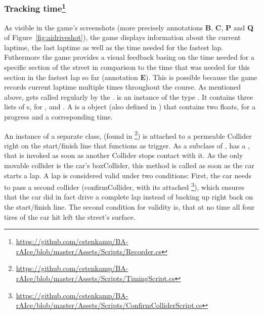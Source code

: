 \subsubsection{Tracking time\footnote{\url{https://github.com/cstenkamp/BA-rAIce/blob/master/Assets/Scripts/Recorder.cs}}}

As visible in the game's screenshots (more precisely annotations \textbf{B}, \textbf{C}, \textbf{P} and \textbf{Q} of Figure~\ref{fig:aidriveshot}), the game displays information about the current laptime, the last laptime as well as the time needed for the fastest lap. Futhermore the game provides a visual feedback basing on the time needed for a specific section of the street in comparison to the time that was needed for this section in the fastest lap so far (annotation \textbf{E}). This is possible because the game records current laptime multiple times throughout the course. As mentioned above,  gets called regularly by the .  is an instance of the type . It contains three lists of s, for ,  and . A  is a  object (also defined in ) that contains two floats, for a progress and a corresponding time.

An instance of a separate class,  (found in \footnote{\url{https://github.com/cstenkamp/BA-rAIce/blob/master/Assets/Scripts/TimingScript.cs}}) is attached to a permeable Collider right on the start/finish line that functions as trigger. As a subclass of ,  has a , that is invoked as soon as another Collider stops contact with it. As the only movable collider is the car's boxCollider, this method is called as soon as the car starts a lap. A lap is considered valid under two conditions: First, the car needs to pass a second collider (confirmCollider, with its attached \footnote{\url{https://github.com/cstenkamp/BA-rAIce/blob/master/Assets/Scripts/ConfirmColliderScript.cs}}), which ensures that the car did in fact drive a complete lap instead of backing up right back on the start/finish line. The second condition for validity is, that at no time all four tires of the car hit left the street's surface.

